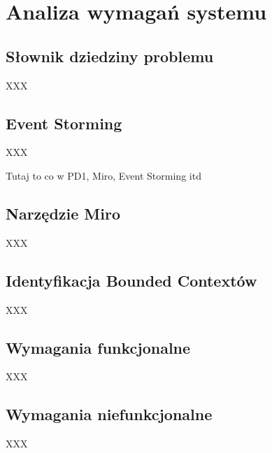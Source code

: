 \clearpage %

\section{Analiza wymagań systemu}

\subsection{Słownik dziedziny problemu}

XXX

\subsection{Event Storming}

XXX

Tutaj to co w PD1, Miro, Event Storming itd

\subsection{Narzędzie Miro}

XXX

\subsection{Identyfikacja Bounded Contextów}

XXX

\subsection{Wymagania funkcjonalne}

XXX

\subsection{Wymagania niefunkcjonalne}

XXX